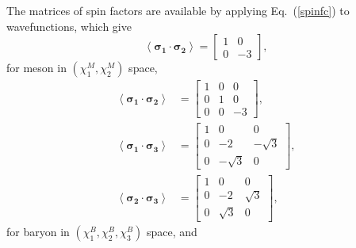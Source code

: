 \documentclass[12pt,onecolumn,floatfix,nofootinbib]{revtex4}
\begin{document}
The matrices of spin factors are available by applying Eq.~(\ref{spinfc}) to
wavefunctions, which give
\begin{equation}  \label{sfcM}
\left\langle \boldsymbol{\sigma_{1}}\cdot \boldsymbol{\sigma_{2}}
\right\rangle=
\begin{bmatrix}
1 & 0 \\
0 & -3%
\end{bmatrix}%
,
\end{equation}
for meson in $(\chi_{1}^{M},\chi_{2}^{M})$ space,
\begin{align}
\left\langle \boldsymbol{\sigma_{1}}\cdot \boldsymbol{\sigma_{2}}
\right\rangle&=
\begin{bmatrix}
1 & 0 & 0 \\
0 & 1 & 0 \\
0 & 0 & -3%
\end{bmatrix}%
, \\
\left\langle \boldsymbol{\sigma_{1}}\cdot \boldsymbol{\sigma_{3}}
\right\rangle&=
\begin{bmatrix}
1 & 0 & 0 \\
0 & -2 & -\sqrt{3} \\
0 & -\sqrt{3} & 0%
\end{bmatrix}%
, \\
\left\langle \boldsymbol{\sigma_{2}}\cdot \boldsymbol{\sigma_{3}}
\right\rangle&=
\begin{bmatrix}
1 & 0 & 0 \\
0 & -2 & \sqrt{3} \\
0 & \sqrt{3} & 0%
\end{bmatrix}%
,
\end{align}
for baryon in $(\chi_{1}^{B},\chi_{2}^{B},\chi_{3}^{B})$ space, and
\end{document}
